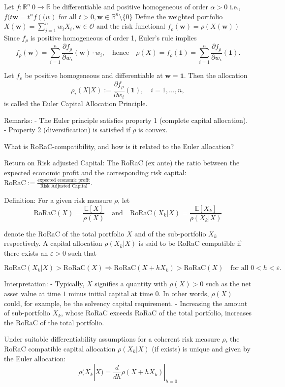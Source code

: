 Let \( f : \mathbb{R}^n \ {0} \to \mathbb{R} \) be differentiable and positive homogeneous of order \( \alpha > 0 \) i.e.,
\( f(t \mathbf{w} = t^\alpha f(\mathbf(w) \) for all \( t > 0, \mathbf{w} \in \mathbb{R}^n \setminus \{0\} \)
Define the weighted portfolio \( X(\mathbf{w}) = \sum_{j=1}^n w_i X_i, \mathbf{w} \in \mathcal{O} \) and the risk functional
\( f_\rho(\mathbf{w}) = \rho(X(\mathbf{w})) \)
Since \(f_{\rho}\) is positive homogeneous of order 1, Euler's rule implies
\[f_{\rho}(\mathbf{w}) = \sum_{i=1}^n \frac{\partial f_{\rho}}{\partial w_i}(\mathbf{w}) \cdot w_i, \quad \text{hence} \quad \rho(X) = f_{\rho}(\mathbf{1}) = \sum_{i=1}^n \frac{\partial f_{\rho}}{\partial w_i}(\mathbf{1}).\]

Let \(f_{\rho}\) be positive homogeneous and differentiable at \(\mathbf{w} = \mathbf{1}\). 
Then the allocation \[\rho_i(X|X) := \frac{\partial f_{\rho}}{\partial w_i}(\mathbf{1}), \quad i=1, \dots, n,\]
is called the Euler Capital Allocation Principle.

Remarks:
- The Euler principle satisfies property 1 (complete capital allocation).
- Property 2 (diversification) is satisfied if \(\rho\) is convex.


What is RoRaC-compatibility, and how is it related to the Euler allocation?

Return on Risk adjusted Capital:
The RoRaC (ex ante) the ratio between the expected economic profit and the corresponding risk capital:
\(
\text{RoRaC} := \frac{\text{expected economic profit}}{\text{Risk Adjusted Capital}}.
\)

Definition: For a given risk measure \(\rho\), let
\[
\text{RoRaC}(X) = \frac{\mathbb{E}[X]}{\rho(X)} 
\quad \text{and} \quad 
\text{RoRaC}(X_k \vert X) = \frac{\mathbb{E}[X_k]}{\rho(X_k \vert X)}
\]

denote the RoRaC of the total portfolio \(X\) and of the sub-portfolio \(X_k\) respectively. A capital allocation \(\rho(X_k \vert X)\) is said to be 
RoRaC compatible if there exists an \(\varepsilon > 0\) such that

\[
\text{RoRaC}(X_k \vert X) > \text{RoRaC}(X) 
\Rightarrow 
\text{RoRaC}(X + hX_k) > \text{RoRaC}(X) 
\quad \text{for all } 0 < h < \varepsilon.
\]

Interpretation:
- Typically, \(X\) signifies a quantity with \(\rho(X) > 0\) such as the net asset value at time \(1\) minus initial capital at time \(0\). In other words, \(\rho(X)\) could, for example, be the solvency capital requirement.
- Increasing the amount of sub-portfolio \(X_k\), whose RoRaC exceeds RoRaC of the total portfolio, increases the RoRaC of the total portfolio.

Under suitable differentiability assumptions for a coherent risk measure \(\rho\), the RoRaC compatible capital allocation \(\rho(X_k|X)\) (if exists) 
is unique and given by the Euler allocation:
\[\rho(X_k|X) = \frac{d}{dh} \rho(X + hX_k)|_{h=0}\]
